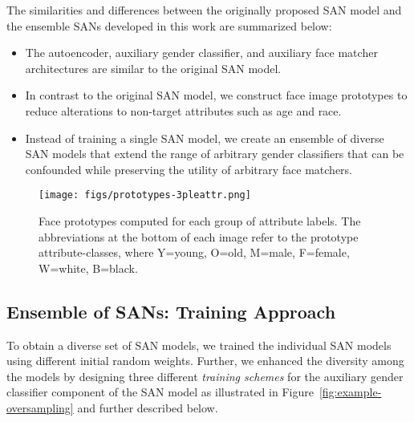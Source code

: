 \documentclass[10pt,twocolumn,letterpaper]{article}
\begin{document}
The similarities and differences between the originally proposed SAN model and the ensemble SANs developed in this work are summarized below:
\begin{itemize}[noitemsep]
\item The autoencoder, auxiliary gender classifier, and auxiliary face matcher architectures are similar to the original SAN model.
\item In contrast to the original SAN model, we construct face image prototypes to reduce alterations to non-target attributes such as age and race.
\item Instead of training a single SAN model, we create an ensemble of diverse SAN models that extend the range of arbitrary gender classifiers that can be confounded while preserving the utility of arbitrary face matchers.
\end{itemize}

\begin{figure}
\begin{center}
   \texttt{[image: figs/prototypes-3pleattr.png]}
\end{center}
   \caption{Face prototypes computed for each group of  attribute labels. The abbreviations at the bottom of each image refer to the prototype attribute-classes, where Y=young, O=old, M=male, F=female, W=white, B=black.}
\label{fig:gender-prototypes}
\end{figure}

\subsection{Ensemble of SANs: Training Approach}

To obtain a diverse set of SAN models, we trained the individual SAN models using different initial random weights. Further, we enhanced the diversity among the models by designing three different {\em training schemes} for the auxiliary gender classifier component of the SAN model as illustrated in Figure~\ref{fig:example-oversampling} and further described below.
\end{document}
